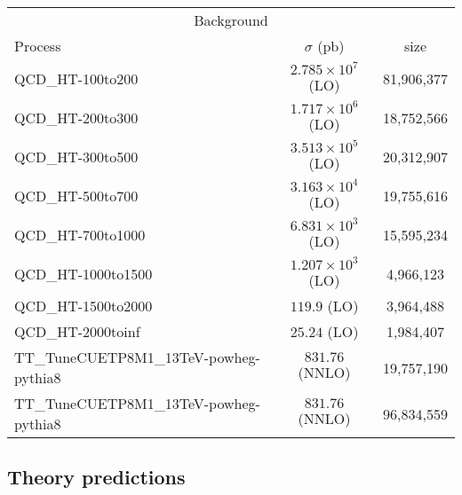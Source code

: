 \begin{table}[htb]\footnotesize
  \begin{center}
    \begin{tabular}{l|c|c}
      \hline
      \hline
      \multicolumn{3}{c}{Background} \\ \cline{1-3}
      Process & $\sigma$ (pb) & size \\
      \hline
      {QCD\_HT-100to200}   & $2.785\times 10^7 $ (LO) & 81,906,377 \\
      {QCD\_HT-200to300}   & $1.717\times 10^6 $ (LO) & 18,752,566 \\
      {QCD\_HT-300to500}   & $3.513\times 10^5 $ (LO) & 20,312,907 \\
      {QCD\_HT-500to700}   & $3.163\times 10^4 $ (LO) & 19,755,616 \\
      {QCD\_HT-700to1000}  & $6.831\times 10^3$  (LO) & 15,595,234 \\
      {QCD\_HT-1000to1500} & $1.207\times 10^3$  (LO) & 4,966,123  \\
      {QCD\_HT-1500to2000} & $119.9 $            (LO) & 3,964,488  \\
      {QCD\_HT-2000toinf}  & $25.24 $            (LO) & 1,984,407  \\
      \hline
      {TT\_TuneCUETP8M1\_13TeV-powheg-pythia8} & $831.76$ (NNLO) & 19,757,190 \\
      {TT\_TuneCUETP8M1\_13TeV-powheg-pythia8} & $831.76$ (NNLO) & 96,834,559 \\
      \hline
      \hline
    \end{tabular}
  \end{center}
\end{table}

\subsection{Theory predictions\label{ss:SignalXsec}}

